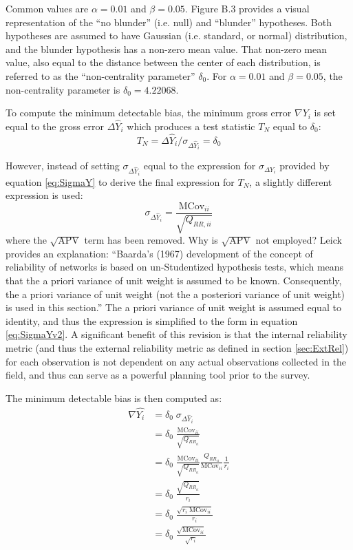 Common values are $\alpha = 0.01$ and $\beta = 0.05$. Figure B.3 provides a visual representation of the ``no blunder'' (i.e. null) and ``blunder'' hypotheses. Both hypotheses are assumed to have Gaussian (i.e. standard, or normal) distribution, and the blunder hypothesis has a non-zero mean value. That non-zero mean value, also equal to the distance between the center of each distribution, is referred to as the ``non-centrality parameter'' $\delta_0$. For $\alpha = 0.01$ and $\beta = 0.05$, the non-centrality parameter is $\delta_0 = 4.22068$. 

To compute the minimum detectable bias, the minimum gross error $\nabla Y_i$ is set equal to the gross error $\Delta \hat{Y}_i$ which produces a test statistic $T_N$ equal to $\delta_0$:
\begin{equation}\label{eq:MinDetectBlunder1}
T_N = \Delta \hat{Y}_i / \sigma_{\Delta \hat{Y}_i} = \delta_0
\end{equation}

However, instead of setting $\sigma_{\Delta \hat{Y}_i}$ equal to the expression for $\sigma_{\Delta Y_i}$ provided by equation \ref{eq:SigmaY} to derive the final expression for $T_N$, a slightly different expression is used:
\begin{equation}\label{eq:SigmaYv2}
\sigma_{\Delta \hat{Y}_i} = \frac{\text{MCov}_{ii}}{\sqrt{Q_{RR,ii}}}
\end{equation}
where the $\sqrt{\text{APV}}$ term has been removed. Why is $\sqrt{\text{APV}}$ not employed? Leick \cite{leick} provides an explanation: ``Baarda’s (1967) development of the concept of reliability of networks is based on un-Studentized hypothesis tests, which means that the a priori variance of unit weight is assumed to be known. Consequently, the a priori variance of unit weight (not the a posteriori variance of unit weight) is used in this section.'' The a priori variance of unit weight is assumed equal to identity, and thus the expression is simplified to the form in equation \ref{eq:SigmaYv2}. A significant benefit of this revision is that the internal reliability metric (and thus the external reliability metric as defined in section \ref{sec:ExtRel}) for each observation is not dependent on any actual observations collected in the field, and thus can serve as a powerful planning tool prior to the survey.

The minimum detectable bias is then computed as:
\begin{equation}\label{eq:MinDetectBlunder2}
\begin{split}
\nabla \hat{Y_i} &= \delta_0 \; \sigma_{\Delta \hat{Y}_i} \\
&= \delta_0 \; \frac{\text{MCov}_{ii}}{\sqrt{Q_{RR_{ii}}}} \\
&= \delta_0 \; \frac{\text{MCov}_{ii}}{\sqrt{Q_{RR_{ii}}}} \frac{Q_{RR_{ii}}}{\text{MCov}_{ii}} \frac{1}{r_i} \\
&= \delta_0 \; \frac{\sqrt{Q_{RR_{ii}}}}{r_i}\\
&= \delta_0 \; \frac{\sqrt{r_i \; \text{MCov}_{ii}}}{r_i}\\
&= \delta_0 \; \frac{\sqrt{\text{MCov}_{ii}}}{\sqrt{r_i}}
\end{split}
\end{equation}

